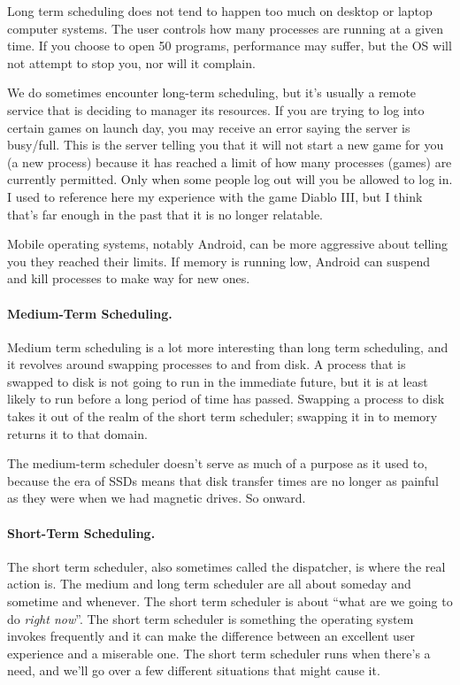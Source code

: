 Long term scheduling does not tend to happen too much on desktop or laptop computer systems. The user controls how many processes are running at a given time. If you choose to open 50 programs, performance may suffer, but the OS will not attempt to stop you, nor will it complain.

We do sometimes encounter long-term scheduling, but it's usually a remote service that is deciding to manager its resources. If you are trying to log into certain games on launch day, you may receive an error saying the server is busy/full. This is the server telling you that it will not start a new game for you (a new process) because it has reached a limit of how many processes (games) are currently permitted. Only when some people log out will you be allowed to log in. I used to reference here my experience with the game Diablo III, but I think that's far enough in the past that it is no longer relatable. 

Mobile operating systems, notably Android, can be more aggressive about telling you they reached their limits. If memory is running low, Android can suspend and kill processes to make way for new ones.

\paragraph{Medium-Term Scheduling.}
Medium term scheduling is a lot more interesting than long term scheduling, and it revolves around swapping processes to and from disk. A process that is swapped to disk is not going to run in the immediate future, but it is at least likely to run before a long period of time has passed. Swapping a process to disk takes it out of the realm of the short term scheduler; swapping it in to memory returns it to that domain.

The medium-term scheduler doesn't serve as much of a purpose as it used to, because the era of SSDs means that disk transfer times are no longer as painful as they were when we had magnetic drives. So onward.

\paragraph{Short-Term Scheduling.}
The short term scheduler, also sometimes called the dispatcher, is where the real action is. The medium and long term scheduler are all about someday and sometime and whenever. The short term scheduler is about ``what are we going to do \textit{right now}''. The short term scheduler is something the operating system invokes frequently and it can make the difference between an excellent user experience and a miserable one. The short term scheduler runs when there's a need, and we'll go over a few different situations that might cause it.

